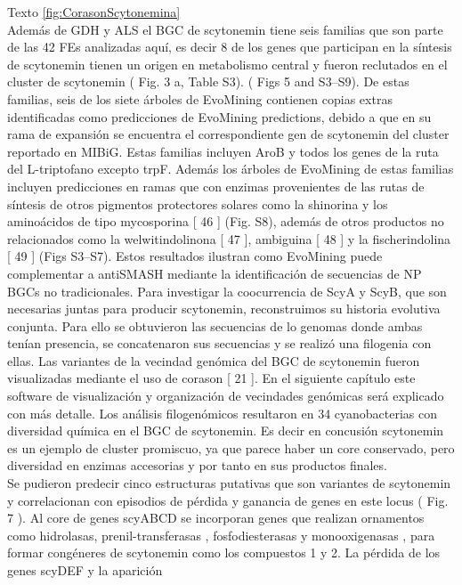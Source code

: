 \documentclass[12pt,twoside]{reedthesis}
\begin{document}
  Texto \autoref{fig:CorasonScytonemina}\\
  Además de GDH y ALS el BGC de scytonemin tiene seis familias que son
  parte de las 42 FEs analizadas aquí, es decir 8 de los genes que
  participan en la síntesis de scytonemin tienen un origen en metabolismo
  central y fueron reclutados en el cluster de scytonemin ( Fig. 3 a,
  Table S3). ( Figs 5 and S3--S9). De estas familias, seis de los siete
  árboles de EvoMining contienen copias extras identificadas como
  predicciones de EvoMining predictions, debido a que en su rama de
  expansión se encuentra el correspondiente gen de scytonemin del cluster
  reportado en MIBiG. Estas familias incluyen AroB y todos los genes de la
  ruta del L-triptofano excepto trpF. Además los árboles de EvoMining de
  estas familias incluyen predicciones en ramas que con enzimas
  provenientes de las rutas de síntesis de otros pigmentos protectores
  solares como la shinorina y los aminoácidos de tipo mycosporina {[} 46
  {]} (Fig. S8), además de otros productos no relacionados como la
  welwitindolinona {[} 47 {]}, ambiguina {[} 48 {]} y la fischerindolina
  {[} 49 {]} (Figs S3--S7). Estos resultados ilustran como EvoMining puede
  complementar a antiSMASH mediante la identificación de secuencias de NP
  BGCs no tradicionales. Para investigar la coocurrencia de ScyA y ScyB,
  que son necesarias juntas para producir scytonemin, reconstruimos su
  historia evolutiva conjunta. Para ello se obtuvieron las secuencias de
  lo genomas donde ambas tenían presencia, se concatenaron sus secuencias
  y se realizó una filogenia con ellas. Las variantes de la vecindad
  genómica del BGC de scytonemin fueron visualizadas mediante el uso de
  corason {[} 21 {]}. En el siguiente capítulo este software de
  visualización y organización de vecindades genómicas será explicado con
  más detalle. Los análisis filogenómicos resultaron en 34 cyanobacterias
  con diversidad química en el BGC de scytonemin. Es decir en concusión
  scytonemin es un ejemplo de cluster promiscuo, ya que parece haber un
  core conservado, pero diversidad en enzimas accesorias y por tanto en
  sus productos finales.\\
  Se pudieron predecir cinco estructuras putativas que son variantes de
  scytonemin y correlacionan con episodios de pérdida y ganancia de genes
  en este locus ( Fig. 7 ). Al core de genes scyABCD se incorporan genes
  que realizan ornamentos como hidrolasas, prenil-transferasas ,
  fosfodiesterasas y monooxigenasas , para formar congéneres de scytonemin
  como los compuestos 1 y 2. La pérdida de los genes scyDEF y la aparición
\end{document}
